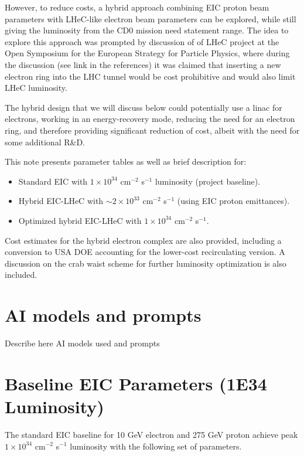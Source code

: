 \documentclass{article}
\begin{document}
However, to reduce costs, a hybrid approach combining EIC proton beam parameters with LHeC-like electron beam parameters can be explored, while still giving the luminosity from the CD0 mission need statement range. The idea to explore this approach was prompted by discussion of of LHeC project at the Open Symposium for the European Strategy for Particle Physics, where during the discussion (see link in the references) it was claimed that inserting a new electron ring into the LHC tunnel would be cost prohibitive and would also limit LHeC luminosity. 

The hybrid design that we will discuss below could potentially use a linac for electrons, working in an energy-recovery mode, reducing the need for an electron ring, and therefore providing significant reduction of cost, albeit with the need for some additional R\&D.

This note presents parameter tables as well as brief description for:
\begin{itemize}
\item
Standard EIC with $1 \times 10^{34}$ cm$^{-2}$ s$^{-1}$ luminosity (project baseline).
\item
Hybrid EIC-LHeC with $\sim 2 \times 10^{33}$ cm$^{-2}$ s$^{-1}$ (using EIC proton emittances).
\item
Optimized hybrid EIC-LHeC with $1 \times 10^{34}$ cm$^{-2}$ s$^{-1}$.
\end{itemize}

Cost estimates for the hybrid electron complex are also provided, including a conversion to USA DOE accounting for the lower-cost recirculating version. A discussion on the crab waist scheme for further luminosity optimization is also included.

\section{AI models and prompts}

Describe here AI models used and prompts

\section{Baseline EIC Parameters (1E34 Luminosity)}

The standard EIC baseline for 10 GeV electron and 275 GeV proton  achieve peak $1 \times 10^{34}$ cm$^{-2}$ s$^{-1}$ luminosity with the following set of parameters.
\end{document}
